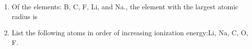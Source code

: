 \documentclass[main.tex]{subfiles}
\begin{document}
\clearpage
\newpage
\thispagestyle{empty}
\begin{fullwidth}
\begin{multicols}{2}\begin{enumerate}[resume]  \setlength\itemsep{0.2em}
    \setcounter{enumi}{\theenumTempD}


\item Of the elements:  B, C, F, Li, and Na., the element with the largest atomic radius is
\begin{enumerate}[label=(\alph*)]\vspace{-0.5cm}
\end{enumerate}\vspace{-0.5cm}

\item List the following atoms in order of increasing ionization energy:Li, Na, C, O, F.
\begin{enumerate}[label=(\alph*)]\vspace{-0.5cm}
\end{enumerate}\vspace{-0.5cm}










\end{enumerate}
\end{multicols}
\end{fullwidth}
\end{document}
